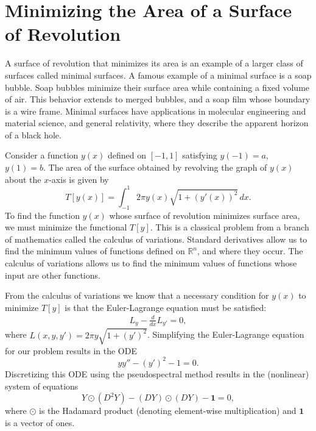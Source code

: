\section*{Minimizing the Area of a Surface of Revolution}
A surface of revolution that minimizes its area is an example of a larger class of surfaces called minimal surfaces. A famous example of a minimal surface is a soap bubble. Soap bubbles minimize their surface area while containing a fixed volume of air. This behavior extends to merged bubbles, and a soap film whose boundary is a wire frame. Minimal surfaces have applications in molecular engineering and material science, and general relativity, where they describe the apparent horizon of a black hole.

Consider a function $y(x)$ defined on $[-1,1]$ satisfying $y(-1) = a $, $y(1) = b. $ The area of the surface obtained by revolving the graph of $y(x)$ about the $x$-axis is given by
\[T[y(x)] = \int_{-1}^1 2 \pi y(x) \sqrt{1 + (y'(x))^2}\, dx .\]
To find the function $y(x)$ whose surface of revolution minimizes surface area, we must minimize the functional $T[y]$.
This is a classical problem from a branch of mathematics called the calculus of variations.
Standard derivatives allow us to find the minimum values of functions defined on $\mathbb{R}^n$, and where they occur.
The calculus of variations allows us to find the minimum values of functions whose input are other functions.

From the calculus of variations we know that a necessary condition for $y(x)$ to minimize $T[y]$ is that the Euler-Lagrange equation must be satisfied:
\begin{align*}
	L_y - \frac{d}{dx}L_{y'} = 0,
\end{align*}
where $L(x,y,y') = 2 \pi y \sqrt{1 + (y')^2}$.
Simplifying the Euler-Lagrange equation for our problem results in the ODE
\[y y'' - (y')^2 -1 = 0.\]
Discretizing this ODE using the pseudospectral method results in the (nonlinear) system of equations
\[
Y \odot (D^2 Y) - (DY) \odot (DY) - \mathbf{1} = 0,
\]
where $\odot$ is the Hadamard product (denoting element-wise multiplication) and  $\mathbf{1}$ is a vector of ones.

